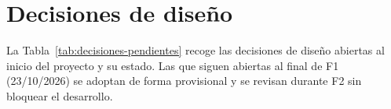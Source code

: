 
\chapter{Decisiones de diseño}
\label{anx:decisiones-diseno}

La Tabla~\ref{tab:decisiones-pendientes} recoge las decisiones de diseño abiertas al inicio del proyecto y su estado. Las que siguen abiertas al final de F1 (23/10/2026) se adoptan de forma provisional y se revisan durante F2 sin bloquear el desarrollo.

